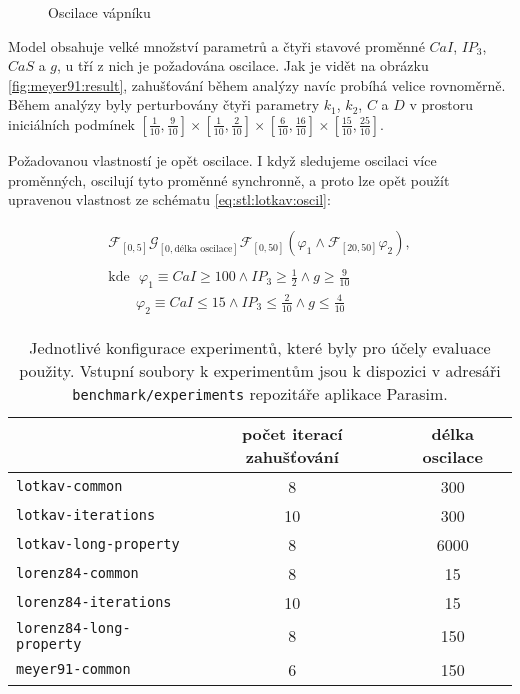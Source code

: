 \begin{figure}[h!]
\begin{center}
\caption{Oscilace vápníku}
\end{center}
\end{figure}

Model obsahuje velké množství parametrů a čtyři stavové proměnné $CaI$, $IP_3$, $CaS$ a $g$, u tří z nich je požadována oscilace.
Jak je vidět na obrázku \ref{fig:meyer91:result}, zahušťování
během analýzy navíc probíhá velice rov\-no\-měr\-ně. Během analýzy byly perturbovány čtyři parametry
$k_1$, $k_2$, $C$ a $D$ v prostoru i\-ni\-ciál\-ních podmínek $[\frac{1}{10}, \frac{9}{10}] \times [\frac{1}{10}, \frac{2}{10}] \times [\frac{6}{10}, \frac{16}{10}] \times [\frac{15}{10}, \frac{25}{10}]$.

Požadovanou vlastností je opět oscilace. I když sledujeme oscilaci více proměnných,
oscilují tyto proměnné synchronně, a proto lze opět použít upravenou vlastnost
ze schématu \ref{eq:stl:lotkav:oscil}:


\begin{align}
\begin{array}{ll}
\label{eq:model:stl:meyer91}
\mathcal{F}_{[0, 5]}\mathcal{G}_{[0, \textrm{délka oscilace}]}\mathcal{F}_{[0, 50]}(\varphi_1  \wedge \mathcal{F}_{[20, 50]}\varphi_2),\\\\
\textrm{kde~~}
\varphi_1 \equiv CaI \geq 100 \wedge IP_3 \geq \frac{1}{2} \wedge g \geq \frac{9}{10}	\\
~~~~~~~~~\varphi_2 \equiv CaI  \leq 15 \wedge IP_3 \leq \frac{2}{10} \wedge g \leq \frac{4}{10}
\end{array}
\end{align}

\begin{table}[h!]
\centering
\begin{tabular}{ l c c }
\toprule
	~ 									& počet iterací zahušťování		& délka oscilace	\\
\midrule
	\texttt{lotkav-common}				& 8								& 300				\\
	\texttt{lotkav-iterations}			& 10							& 300				\\
	\texttt{lotkav-long-property}		& 8								& 6000				\\
	\texttt{lorenz84-common}			& 8								& 15				\\
	\texttt{lorenz84-iterations}		& 10							& 15				\\
	\texttt{lorenz84-long-property}		& 8								& 150				\\
	\texttt{meyer91-common}				& 6								& 150				\\
\bottomrule
\end{tabular}
\caption{Jednotlivé konfigurace experimentů, které byly pro účely evaluace použity. Vstupní soubory k experimentům jsou k dispozici v adresáři \texttt{benchmark/experiments} repozitáře aplikace Parasim.}
\label{tabular:benchmark:models}
\end{table}

